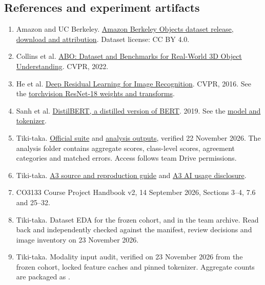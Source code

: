 \documentclass[final]{hcmut-report}
\newcommand{\code}[1]{\texttt{\detokenize{#1}}}
\newcommand{\source}[2]{\href{#1}{#2}}
\begin{document}
\begin{samepage}
\section*{References and experiment artifacts}
{}
\begin{enumerate}
\item Amazon and UC Berkeley. \source{https://amazon-berkeley-objects.s3.us-east-1.amazonaws.com/index.html}{Amazon Berkeley Objects dataset release, download and attribution}. Dataset license: CC BY 4.0.
\item Collins et al. \source{https://openaccess.thecvf.com/content/CVPR2022/html/Collins_ABO_Dataset_and_Benchmarks_for_Real-World_3D_Object_Understanding_CVPR_2022_paper.html}{ABO: Dataset and Benchmarks for Real-World 3D Object Understanding}. CVPR, 2022.
\item He et al. \source{https://openaccess.thecvf.com/content_cvpr_2016/html/He_Deep_Residual_Learning_CVPR_2016_paper.html}{Deep Residual Learning for Image Recognition}. CVPR, 2016. See the \source{https://docs.pytorch.org/vision/stable/models/generated/torchvision.models.resnet18.html}{torchvision ResNet-18 weights and transforms}.
\item Sanh et al. \source{https://arxiv.org/abs/1910.01108}{DistilBERT, a distilled version of BERT}. 2019. See the \source{https://huggingface.co/distilbert/distilbert-base-uncased}{model and tokenizer}.
\item Tiki-taka. \source{https://drive.google.com/drive/folders/1UMayAvNgLG3IM5x_C7dVYo_VJc8kcZi0}{Official suite} and \source{https://drive.google.com/drive/folders/1Sa2vh_SJiCH8ZsHjvW9fLZdYda61oKzm}{analysis outputs}, verified 22 November 2026. The analysis folder contains aggregate scores, class-level scores, agreement categories and matched errors. Access follows team Drive permissions.
\item Tiki-taka. \source{https://github.com/TuanKhai1210/Deep-Learning-Benchmark-Suite/tree/feat/a3-basecode/configs/a3}{A3 source and reproduction guide} and \source{https://github.com/TuanKhai1210/Deep-Learning-Benchmark-Suite/blob/feat/a3-basecode/docs/a3-ai-usage.md}{A3 AI usage disclosure}.
\item CO3133 Course Project Handbook v2, 14 September 2026, Sections 3--4, 7.6 and 25--32.
\item Tiki-taka. Dataset EDA for the frozen \code{abo-v1} cohort,  and \code{notebooks/a3_eda.ipynb} in the team archive. Read back and independently checked against the manifest, review decisions and image inventory on 23 November 2026.
\item Tiki-taka. Modality input audit, verified on 23 November 2026 from the frozen cohort, locked feature caches and pinned tokenizer. Aggregate counts are packaged as .
\end{enumerate}
\end{samepage}
\end{document}
